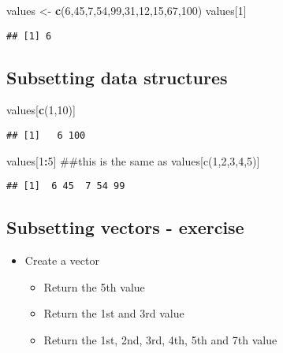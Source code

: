 \documentclass[]{article}
\newenvironment{Shaded}{\begin{snugshade}}{\end{snugshade}}
\newcommand{\KeywordTok}[1]{\textcolor[rgb]{0.13,0.29,0.53}{\textbf{#1}}}
\newcommand{\DecValTok}[1]{\textcolor[rgb]{0.00,0.00,0.81}{#1}}
\newcommand{\StringTok}[1]{\textcolor[rgb]{0.31,0.60,0.02}{#1}}
\newcommand{\OperatorTok}[1]{\textcolor[rgb]{0.81,0.36,0.00}{\textbf{#1}}}
\newcommand{\NormalTok}[1]{#1}
\providecommand{\tightlist}{%
  \setlength{\itemsep}{0pt}\setlength{\parskip}{0pt}}
\begin{document}
\begin{Shaded}
\begin{Highlighting}[]
\NormalTok{values <-}\StringTok{ }\KeywordTok{c}\NormalTok{(}\DecValTok{6}\NormalTok{,}\DecValTok{45}\NormalTok{,}\DecValTok{7}\NormalTok{,}\DecValTok{54}\NormalTok{,}\DecValTok{99}\NormalTok{,}\DecValTok{31}\NormalTok{,}\DecValTok{12}\NormalTok{,}\DecValTok{15}\NormalTok{,}\DecValTok{67}\NormalTok{,}\DecValTok{100}\NormalTok{)}
\NormalTok{values[}\DecValTok{1}\NormalTok{]}
\end{Highlighting}
\end{Shaded}

\begin{verbatim}
## [1] 6
\end{verbatim}

\subsection{Subsetting data
structures}\label{subsetting-data-structures-1}

\begin{Shaded}
\begin{Highlighting}[]
\NormalTok{values[}\KeywordTok{c}\NormalTok{(}\DecValTok{1}\NormalTok{,}\DecValTok{10}\NormalTok{)]}
\end{Highlighting}
\end{Shaded}

\begin{verbatim}
## [1]   6 100
\end{verbatim}

\begin{Shaded}
\begin{Highlighting}[]
\NormalTok{values[}\DecValTok{1}\OperatorTok{:}\DecValTok{5}\NormalTok{] ##this is the same as values[c(1,2,3,4,5)]}
\end{Highlighting}
\end{Shaded}

\begin{verbatim}
## [1]  6 45  7 54 99
\end{verbatim}

\subsection{Subsetting vectors -
exercise}\label{subsetting-vectors---exercise}

\begin{itemize}
\tightlist
\item
  Create a vector

  \begin{itemize}
  \tightlist
  \item
    Return the 5th value
  \item
    Return the 1st and 3rd value
  \item
    Return the 1st, 2nd, 3rd, 4th, 5th and 7th value
  \end{itemize}
\end{itemize}
\end{document}
